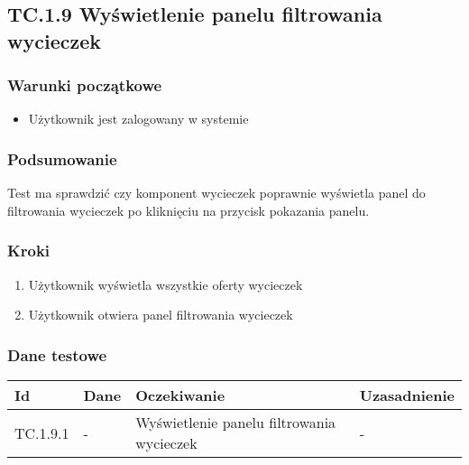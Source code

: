 \documentclass[a4paper,15pt]{article}
\begin{document}
\newpage
\begin{framed}
\subsection{TC.1.9 Wyświetlenie panelu filtrowania wycieczek}


\vspace{0.5cm}

\subsubsection{Warunki początkowe}
\begin{itemize}
\item Użytkownik jest zalogowany w systemie
\end{itemize}

\subsubsection{Podsumowanie}
Test ma sprawdzić czy komponent wycieczek poprawnie wyświetla panel do filtrowania wycieczek po kliknięciu na przycisk pokazania panelu. 

\subsubsection{Kroki}
\begin{enumerate}
\item Użytkownik wyświetla wszystkie oferty wycieczek
\item Użytkownik otwiera panel filtrowania wycieczek
\end{enumerate}

\subsubsection{Dane testowe}

\begin{center}
\begin{tabular}{ |C{1.5cm}|C{3cm}|C{4cm}|C{4cm}| } 
 \hline
 \textbf{Id} & \textbf{Dane} & \textbf{Oczekiwanie} & \textbf{Uzasadnienie} \\ \hline
 TC.1.9.1 & - & Wyświetlenie panelu filtrowania wycieczek & - \\ \hline
\end{tabular}
\end{center}

\end{framed}
\end{document}
